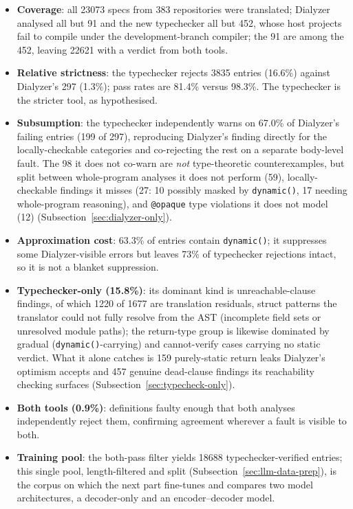 \begin{itemize}
    \item \textbf{Coverage}: all \num{23073} specs from 383 repositories were translated; Dialyzer analysed all but 91 and the new typechecker all but 452, whose host projects fail to compile under the development-branch compiler; the 91 are among the 452, leaving \num{22621} with a verdict from both tools.
    \item \textbf{Relative strictness}: the typechecker rejects \num{3835} entries (16.6\%) against Dialyzer's 297 (1.3\%); pass rates are 81.4\% versus 98.3\%. The typechecker is the stricter tool, as hypothesised.
    \item \textbf{Subsumption}: the typechecker independently warns on 67.0\% of Dialyzer's failing entries (199 of 297), reproducing Dialyzer's finding directly for the locally-checkable categories and co-rejecting the rest on a separate body-level fault. The 98 it does not co-warn are \emph{not} type-theoretic counterexamples, but split between whole-program analyses it does not perform (59), locally-checkable findings it misses (27: 10 possibly masked by \texttt{dynamic()}, 17 needing whole-program reasoning), and \texttt{@opaque} type violations it does not model (12) (Subsection~\ref{sec:dialyzer-only}).
    \item \textbf{Approximation cost}: 63.3\% of entries contain \texttt{dynamic()}; it suppresses some Dialyzer-visible errors but leaves 73\% of typechecker rejections intact, so it is not a blanket suppression.
    \item \textbf{Typechecker-only (15.8\%)}: its dominant kind is unreachable-clause findings, of which \num{1220} of \num{1677} are translation residuals, struct patterns the translator could not fully resolve from the AST (incomplete field sets or unresolved module paths); the return-type group is likewise dominated by gradual (\texttt{dynamic()}-carrying) and cannot-verify cases carrying no static verdict. What it alone catches is 159 purely-static return leaks Dialyzer's optimism accepts and 457 genuine dead-clause findings its reachability checking surfaces (Subsection~\ref{sec:typecheck-only}).
    \item \textbf{Both tools (0.9\%)}: definitions faulty enough that both analyses independently reject them, confirming agreement wherever a fault is visible to both.
    \item \textbf{Training pool}: the both-pass filter yields \num{18688} typechecker-verified entries; this single pool, length-filtered and split (Subsection~\ref{sec:llm-data-prep}), is the corpus on which the next part fine-tunes and compares two model architectures, a decoder-only and an encoder--decoder model.
\end{itemize}

